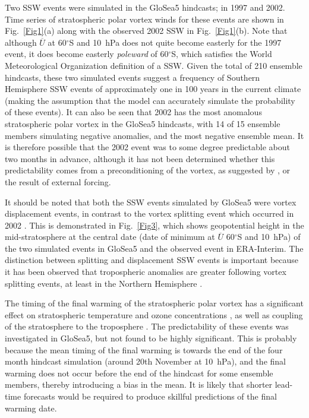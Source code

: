 Two SSW events were simulated in the GloSea5 hindcasts; in 1997 and 2002. Time series of stratospheric polar vortex winds for these events are shown in Fig.\ \ref{Fig1}(a) along with the observed 2002 SSW in Fig.\ \ref{Fig1}(b). Note that although $\overline{U}$ at 60$^{\circ}$S and 10~hPa does not quite become easterly for the 1997 event, it does become easterly \emph{poleward} of 60$^{\circ}$S, which satisfies the World Meteorological Organization definition of a SSW. Given the total of 210 ensemble hindcasts, these two simulated events suggest a frequency of Southern Hemisphere SSW events of approximately one in 100 years in the current climate (making the assumption that the model can accurately simulate the probability of these events). It can also be seen that 2002 has the most anomalous stratospheric polar vortex in the GloSea5 hindcasts, with 14 of 15 ensemble members simulating negative anomalies, and the most negative ensemble mean. It is therefore possible that the 2002 event was to some degree predictable about two months in advance, although it has not been determined whether this predictability comes from a preconditioning of the vortex, as suggested by \citet{Scaife2005c}, or the result of external forcing. 

It should be noted that both the SSW events simulated by GloSea5 were vortex displacement events, in contrast to the vortex splitting event which occurred in 2002 \citep{Charlton2005a}. This is demonstrated in Fig.\ \ref{Fig3}, which shows geopotential height in the mid-stratosphere at the central date (date of minimum at $\overline{U}$ 60$^{\circ}$S and 10~hPa) of the two simulated events in GloSea5 and the observed event in ERA-Interim. The distinction between splitting and displacement SSW events is important because it has been observed that tropospheric anomalies are greater following vortex splitting events, at least in the Northern Hemisphere \citep{Nakagawa2006, Mitchell2013}.

The timing of the final warming of the stratospheric polar vortex has a significant effect on stratospheric temperature and ozone concentrations \citep{Yamazaki1987}, as well as coupling of the stratosphere to the troposphere \citep{Black2007}. The predictability of these events was investigated in GloSea5, but not found to be highly significant. This is probably because the mean timing of the final warming is towards the end of the four month hindcast simulation (around 20th November at 10~hPa), and the final warming does not occur before the end of the hindcast for some ensemble members, thereby introducing a bias in the mean. It is likely that shorter lead-time forecasts would be required to produce skillful predictions of the final warming date.


